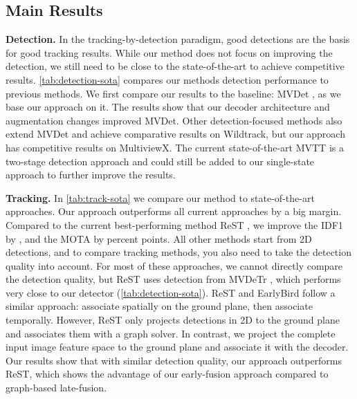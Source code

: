 \documentclass[10pt,twocolumn,letterpaper]{article}
\newcommand{\nparagraph}[1]{\noindent\textbf{#1.  }}
\def\sname{EarlyBird\xspace}
\begin{document}
{\subsection{Main Results}

\nparagraph{Detection} In the tracking-by-detection paradigm, good detections are the basis for good tracking results. While our method does not focus on improving the detection, we still need to be close to the state-of-the-art to achieve competitive results. \cref{tab:detection-sota} compares our methods detection performance to previous methods. We first compare our results to the baseline: MVDet \cite{hou2020multiview}, as we base our approach on it. The results show that our decoder architecture and augmentation changes improved MVDet. Other detection-focused methods \cite{hou2021multiview, lee2023multi, song2021stacked} also extend MVDet and achieve comparative results on Wildtrack, but our approach has competitive results on MultiviewX. The current state-of-the-art MVTT \cite{lee2023multi} is a two-stage detection approach and could still be added to our single-state approach to further improve the results.

\nparagraph{Tracking} In \cref{tab:track-sota} we compare our method to state-of-the-art approaches. Our approach outperforms all current approaches by a big margin. Compared to the current best-performing method ReST \cite{cheng2023rest}, we improve the IDF1 by , and the MOTA by  percent points. All other methods \cite{chavdarova2018wildtrack, nguyen2022lmgp, ong2020bayesian, you2020real, cheng2023rest} start from 2D detections, and to compare tracking methods, you also need to take the detection quality into account. For most of these approaches, we cannot directly compare the detection quality, but ReST \cite{cheng2023rest} uses detection from MVDeTr \cite{hou2021multiview}, which performs very close to our detector (\cf \cref{tab:detection-sota}). ReST and \sname follow a similar approach: associate spatially on the ground plane, then associate temporally. However, ReST only projects detections in 2D to the ground plane and associates them with a graph solver. In contrast, we project the complete input image feature space to the ground plane and associate it with the decoder. Our results show that with similar detection quality, our approach outperforms ReST, which shows the advantage of our early-fusion approach compared to graph-based late-fusion.


}
\end{document}
